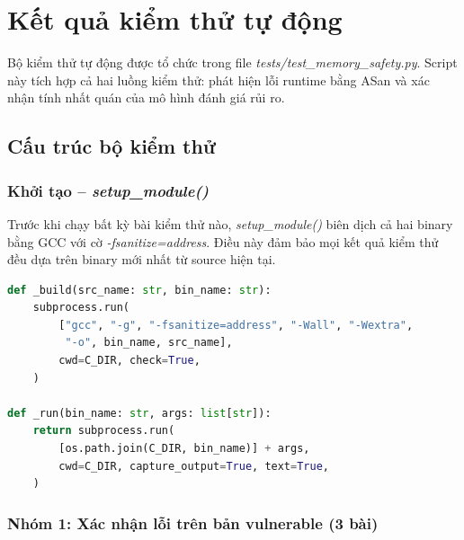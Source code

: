 
\section{Kết quả kiểm thử tự động}
\label{sec:tudong}

Bộ kiểm thử tự động được tổ chức trong file
\textit{tests/test\_memory\_safety.py}. Script này tích hợp cả hai luồng
kiểm thử: phát hiện lỗi runtime bằng ASan và xác nhận tính nhất quán của
mô hình đánh giá rủi ro.

\subsection{Cấu trúc bộ kiểm thử}

\subsubsection{Khởi tạo -- \textit{setup\_module()}}

Trước khi chạy bất kỳ bài kiểm thử nào, \textit{setup\_module()} biên dịch
cả hai binary bằng GCC với cờ \textit{-fsanitize=address}. Điều này đảm bảo
mọi kết quả kiểm thử đều dựa trên binary mới nhất từ source hiện tại.

\begin{lstlisting}[language=Python, caption={Hàm biên dịch và chạy binary}]
def _build(src_name: str, bin_name: str):
    subprocess.run(
        ["gcc", "-g", "-fsanitize=address", "-Wall", "-Wextra",
         "-o", bin_name, src_name],
        cwd=C_DIR, check=True,
    )

def _run(bin_name: str, args: list[str]):
    return subprocess.run(
        [os.path.join(C_DIR, bin_name)] + args,
        cwd=C_DIR, capture_output=True, text=True,
    )
\end{lstlisting}

\subsubsection{Nhóm 1: Xác nhận lỗi trên bản vulnerable (3 bài)}

